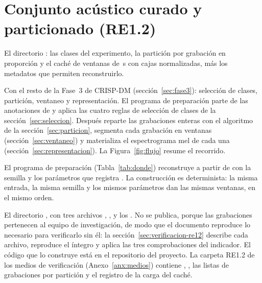 \section{Conjunto acústico curado y particionado (RE1.2)}
\label{sec:re12}

 El directorio : las \nClasses{} clases
del experimento, la partición por grabación en proporción \splitRatios{} y el
caché de \nWindows{} ventanas de \clipLen{}\,s con \nBoxes{} cajas normalizadas,
más los metadatos que permiten reconstruirlo.

 Con el resto de la Fase~3 de CRISP-DM
(sección~\ref{sec:fase3}): selección de clases, partición, ventaneo y
representación. El programa de preparación parte de las
\nAnnotationsCleaned{} anotaciones de  y aplica las cuatro
reglas de selección de clases de la sección~\ref{sec:seleccion}. Después reparte
las grabaciones enteras con el algoritmo de la sección~\ref{sec:particion},
segmenta cada grabación en ventanas (sección~\ref{sec:ventaneo}) y materializa el
espectrograma mel de cada una (sección~\ref{sec:representacion}). La
Figura~\ref{fig:flujo} resume el recorrido.

 El programa de preparación (Tabla~\ref{tab:donde})
reconstruye  a partir de  con la semilla y los
parámetros que registra . La construcción es determinista: la
misma entrada, la misma semilla y los mismos parámetros dan las mismas ventanas,
en el mismo orden.

 El directorio ,
con tres archivos , ,  y los
. No se publica, porque las grabaciones pertenecen al equipo
de investigación, de modo que el documento reproduce lo necesario para verificarlo
sin él: la sección~\ref{sec:verificacion-re12} describe cada archivo, reproduce el
 íntegro y aplica las tres comprobaciones del indicador. El código que lo construye está en el
repositorio del proyecto. La carpeta RE1.2 de los medios de verificación
(Anexo~\ref{anx:medios}) contiene , , las listas
de grabaciones por partición y el registro de la carga del caché.

